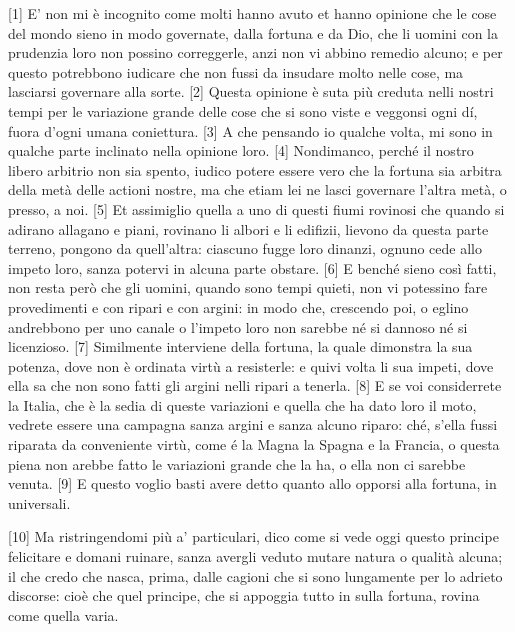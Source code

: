{[}1{]} E' non mi è incognito come molti hanno avuto et hanno opinione
che le cose del mondo sieno in modo governate, dalla fortuna e da Dio,
che li uomini con la prudenzia loro non possino correggerle, anzi non vi
abbino remedio alcuno; e per questo potrebbono iudicare che non fussi da
insudare molto nelle cose, ma lasciarsi governare alla sorte. {[}2{]}
Questa opinione è suta più creduta nelli nostri tempi per le variazione
grande delle cose che si sono viste e veggonsi ogni dí, fuora d'ogni
umana coniettura. {[}3{]} A che pensando io qualche volta, mi sono in
qualche parte inclinato nella opinione loro. {[}4{]} Nondimanco, perché
il nostro libero arbitrio non sia spento, iudico potere essere vero che
la fortuna sia arbitra della metà delle actioni nostre, ma che etiam lei
ne lasci governare l'altra metà, o presso, a noi. {[}5{]} Et assimiglio
quella a uno di questi fiumi rovinosi che quando si adirano allagano e
piani, rovinano li albori e li edifizii, lievono da questa parte
terreno, pongono da quell'altra: ciascuno fugge loro dinanzi, ognuno
cede allo impeto loro, sanza potervi in alcuna parte obstare. {[}6{]} E
benché sieno così fatti, non resta però che gli uomini, quando sono
tempi quieti, non vi potessino fare provedimenti e con ripari e con
argini: in modo che, crescendo poi, o eglino andrebbono per uno canale o
l'impeto loro non sarebbe né si dannoso né si licenzioso. {[}7{]}
Similmente interviene della fortuna, la quale dimonstra la sua potenza,
dove non è ordinata virtù a resisterle: e quivi volta li sua impeti,
dove ella sa che non sono fatti gli argini nelli ripari a tenerla.
{[}8{]} E se voi considerrete la Italia, che è la sedia di queste
variazioni e quella che ha dato loro il moto, vedrete essere una
campagna sanza argini e sanza alcuno riparo: ché, s'ella fussi riparata
da conveniente virtù, come é la Magna la Spagna e la Francia, o questa
piena non arebbe fatto le variazioni grande che la ha, o ella non ci
sarebbe venuta. {[}9{]} E questo voglio basti avere detto quanto allo
opporsi alla fortuna, in universali.

{[}10{]} Ma ristringendomi più a' particulari, dico come si vede oggi
questo principe felicitare e domani ruinare, sanza avergli veduto mutare
natura o qualità alcuna; il che credo che nasca, prima, dalle cagioni
che si sono lungamente per lo adrieto discorse: cioè che quel principe,
che si appoggia tutto in sulla fortuna, rovina come quella varia.

